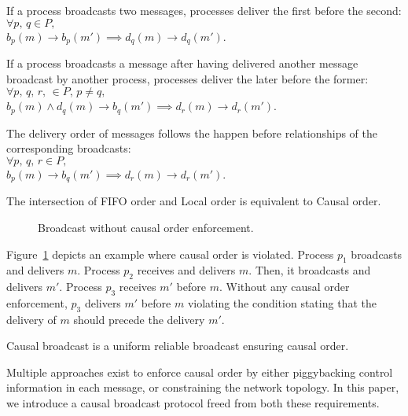 \begin{definition}
  If a process broadcasts two messages, processes deliver the first before the
  second:\\
  $\forall p,\,q \in P,\,$\\$b_p(m) \rightarrow b_p(m') \implies d_q(m) \rightarrow
  d_q(m')$.
\end{definition}

\begin{definition}
  If a process broadcasts a message after having delivered another message
  broadcast by another process, processes deliver the later before the former:\\
  $\forall p,\,q,\,r,\, \in P,\,p\neq q,\,$\\$b_p(m) \wedge d_q(m) \rightarrow b_q(m') \implies d_r(m) \rightarrow d_r(m')$.
\end{definition}

\begin{definition}
  The delivery order of messages follows the happen before relationships of the
  corresponding broadcasts:\\ $\forall
  p,\,q,\,r \in P,\,$\\$b_p(m) \rightarrow b_q(m') \implies d_r(m) \rightarrow d_r(m')$.
\end{definition}

\begin{theorem}
  The intersection of FIFO order and Local order is equivalent to Causal order.
\end{theorem}

\begin{figure}
  \begin{center}
  
  \caption{\label{fig:generalproblem}Broadcast without causal order
    enforcement.}
  \end{center}
\end{figure}

Figure~\ref{fig:generalproblem} depicts an example where causal order is
violated. Process $p_1$ broadcasts and delivers $m$. Process $p_2$ receives and
delivers $m$. Then, it broadcasts and delivers $m'$. Process $p_3$ receives $m'$
before $m$. Without any causal order enforcement, $p_3$ delivers $m'$ before $m$
violating the condition stating that the delivery of $m$ should precede the
delivery $m'$.

\begin{definition}
  Causal broadcast is a uniform reliable broadcast ensuring causal order.
\end{definition}

Multiple approaches exist to enforce causal order by either piggybacking control
information in each message, or constraining the network topology. In this
paper, we introduce a causal broadcast protocol freed from both these
requirements.


